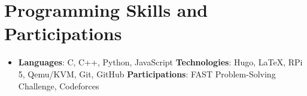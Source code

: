 \documentclass[letterpaper,11pt]{article}
\begin{document}
	
	
	
	\section{Programming Skills and Participations}

\begin{itemize}
	\item 
	\textbf{Languages}: C, C++, Python, JavaScript\hfill
	\textbf{Technologies}: Hugo, LaTeX, RPi 5, Qemu/KVM, Git, GitHub\hfill
	\textbf{Participations}: FAST Problem-Solving Challenge, Codeforces
\end{itemize}
	
	
\
\end{document}

